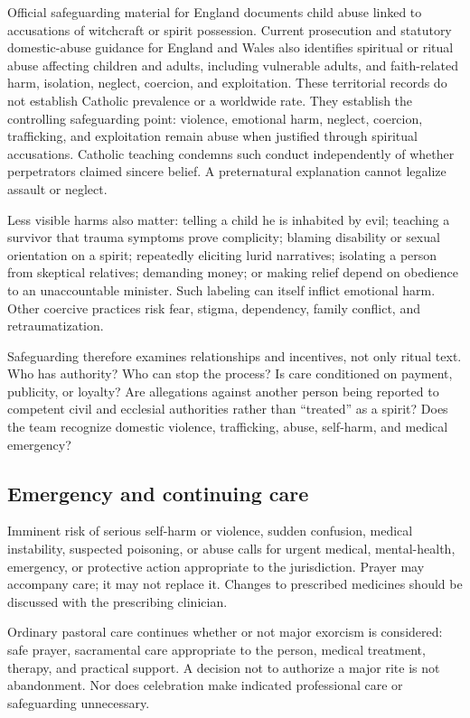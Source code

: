 Official safeguarding material for England documents child abuse linked to
accusations of witchcraft or spirit possession. Current prosecution and
statutory domestic-abuse guidance for England and Wales also identifies
spiritual or ritual abuse affecting children and adults, including vulnerable
adults, and faith-related harm, isolation, neglect, coercion, and exploitation.
These territorial records do not establish Catholic prevalence or a worldwide
rate. They establish the controlling safeguarding point:
violence, emotional harm, neglect, coercion, trafficking, and exploitation
remain abuse when justified through spiritual accusations.
Catholic teaching condemns such conduct independently of whether perpetrators
claimed sincere belief. A preternatural explanation cannot legalize assault or
neglect.

Less visible harms also matter: telling a child he is inhabited by evil;
teaching a survivor that trauma symptoms prove complicity; blaming disability
or sexual orientation on a spirit; repeatedly eliciting lurid narratives;
isolating a person from skeptical relatives; demanding money; or making relief
depend on obedience to an unaccountable minister. Such labeling can itself
inflict emotional harm. Other coercive practices risk fear, stigma, dependency,
family conflict, and retraumatization.

Safeguarding therefore examines relationships and incentives, not only ritual
text. Who has authority? Who can stop the process? Is care conditioned on
payment, publicity, or loyalty? Are allegations against another person being
reported to competent civil and ecclesial authorities rather than ``treated''
as a spirit? Does the team recognize domestic violence, trafficking, abuse,
self-harm, and medical emergency?

\subsection{Emergency and continuing care}

Imminent risk of serious self-harm or violence, sudden confusion, medical
instability, suspected poisoning, or abuse calls for urgent medical,
mental-health, emergency, or protective action appropriate to the jurisdiction.
Prayer may accompany care; it may not replace it. Changes to prescribed
medicines should be discussed with the prescribing clinician.

Ordinary pastoral care continues whether or not major exorcism is considered:
safe prayer, sacramental care appropriate to the person, medical treatment,
therapy, and practical support. A decision not to authorize
a major rite is not abandonment. Nor does celebration make indicated
professional care or safeguarding unnecessary.

